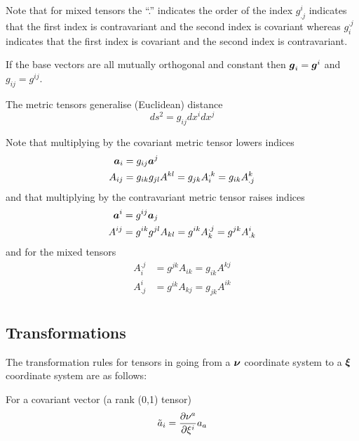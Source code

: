 Note that for mixed tensors the ``.'' indicates the order of the index \ie
$g^{i}_{.j}$ indicates that the first index is contravariant and the second
index is covariant whereas $g_{i}^{.j}$ indicates that the first index is
covariant and the second index is contravariant.

If the base vectors are all mutually orthogonal and constant then
$\vect{g}_{i}=\vect{g}^{i}$ and $g_{ij}=g^{ij}$.

The metric tensors generalise (Euclidean) distance \ie
\begin{equation}
  ds^{2}=g_{ij}dx^{i}dx^{j}
\end{equation}

Note that multiplying by the covariant metric tensor lowers indices \ie
\begin{equation}
  \begin{split}
    \vect{A}_{i} &= g_{ij}\vect{A}^{j} \\
    A_{ij} &= g_{ik}g_{jl}A^{kl} = g_{jk}A_{i}^{.k} = g_{ik}A^{k}_{.j} 
  \end{split}
\end{equation}
and that multiplying by the contravariant metric tensor raises indices \ie
\begin{equation}
  \begin{split}
  \vect{A}^{i} &=  g^{ij}\vect{A}_{j} \\
   A^{ij} &= g^{ik}g^{jl}A_{kl} = g^{ik}A_{k}^{.j} = g^{jk}A^{i}_{.k}
  \end{split}
\end{equation}
and for the mixed tensors
\begin{equation}
  \begin{split}
  A_{i}^{.j} &= g^{jk}A_{ik} = g_{ik}A^{kj} \\
  A^{i}_{.j} &= g^{ik}A_{kj} = g_{jk}A^{ik} \\
  \end{split}
\end{equation}

\subsection{Transformations}

The transformation rules for tensors in going from a $\vect{\nu}$ coordinate
system to a $\vect{\xi}$ coordinate system are as follows: 


For a covariant vector (a rank (0,1) tensor)
\begin{equation}
  {\tilde{a}}_{i}= \dfrac{\partial \nu^{a}}{\partial \xi^{i}} a_{a}
\end{equation}

